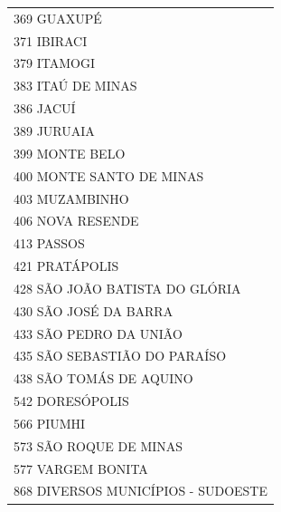\documentclass{article}
\begin{document}
\begin{longtable}[c]{m{18cm}}
\multicolumn{1}{l}{ \hspace{2em} 369 GUAXUPÉ } \\
\multicolumn{1}{l}{ \hspace{2em} 371 IBIRACI } \\
\multicolumn{1}{l}{ \hspace{2em} 379 ITAMOGI } \\
\multicolumn{1}{l}{ \hspace{2em} 383 ITAÚ DE MINAS } \\
\multicolumn{1}{l}{ \hspace{2em} 386 JACUÍ } \\
\multicolumn{1}{l}{ \hspace{2em} 389 JURUAIA } \\
\multicolumn{1}{l}{ \hspace{2em} 399 MONTE BELO } \\
\multicolumn{1}{l}{ \hspace{2em} 400 MONTE SANTO DE MINAS } \\
\multicolumn{1}{l}{ \hspace{2em} 403 MUZAMBINHO } \\
\multicolumn{1}{l}{ \hspace{2em} 406 NOVA RESENDE } \\
\multicolumn{1}{l}{ \hspace{2em} 413 PASSOS } \\
\multicolumn{1}{l}{ \hspace{2em} 421 PRATÁPOLIS } \\
\multicolumn{1}{l}{ \hspace{2em} 428 SÃO JOÃO BATISTA DO GLÓRIA } \\
\multicolumn{1}{l}{ \hspace{2em} 430 SÃO JOSÉ DA BARRA } \\
\multicolumn{1}{l}{ \hspace{2em} 433 SÃO PEDRO DA UNIÃO } \\
\multicolumn{1}{l}{ \hspace{2em} 435 SÃO SEBASTIÃO DO PARAÍSO } \\
\multicolumn{1}{l}{ \hspace{2em} 438 SÃO TOMÁS DE AQUINO } \\
\multicolumn{1}{l}{ \hspace{2em} 542 DORESÓPOLIS } \\
\multicolumn{1}{l}{ \hspace{2em} 566 PIUMHI } \\
\multicolumn{1}{l}{ \hspace{2em} 573 SÃO ROQUE DE MINAS } \\
\multicolumn{1}{l}{ \hspace{2em} 577 VARGEM BONITA } \\
\multicolumn{1}{l}{ \hspace{2em} 868 DIVERSOS MUNICÍPIOS - SUDOESTE } \\
\end{longtable}
\end{document}

